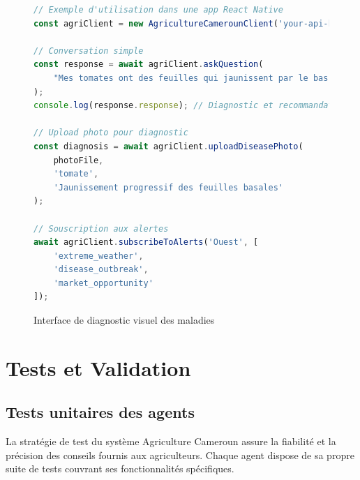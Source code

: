 \begin{figure}[H]
\begin{lstlisting}[language=JavaScript, caption=Intégration JavaScript de l'API]
// Exemple d'utilisation dans une app React Native
const agriClient = new AgricultureCamerounClient('your-api-key');

// Conversation simple
const response = await agriClient.askQuestion(
    "Mes tomates ont des feuilles qui jaunissent par le bas"
);
console.log(response.response); // Diagnostic et recommandations

// Upload photo pour diagnostic
const diagnosis = await agriClient.uploadDiseasePhoto(
    photoFile,
    'tomate',
    'Jaunissement progressif des feuilles basales'
);

// Souscription aux alertes
await agriClient.subscribeToAlerts('Ouest', [
    'extreme_weather',
    'disease_outbreak',
    'market_opportunity'
]);
\end{lstlisting}
\end{figure}

\begin{figure}[H]
\centering
{}
\caption{Interface de diagnostic visuel des maladies}
\end{figure}

\section{Tests et Validation}

\subsection{Tests unitaires des agents}

La stratégie de test du système Agriculture Cameroun assure la fiabilité et la précision des conseils fournis aux agriculteurs. Chaque agent dispose de sa propre suite de tests couvrant ses fonctionnalités spécifiques.

